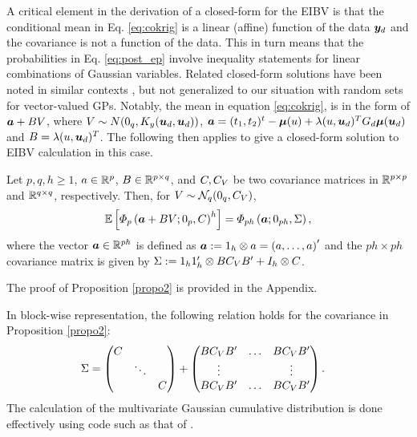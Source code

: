 \documentclass[aoas]{imsart}
\begin{document}
A critical element in the derivation of a closed-form for the EIBV is
that the conditional mean in Eq. \eqref{eq:cokrig} is a linear
(affine) function of the data ${\boldsymbol y}_d$ and the covariance is not a
function of the data. This in turn means that the probabilities in Eq.
\eqref{eq:post_ep} involve inequality statements for linear
combinations of Gaussian variables. Related closed-form solutions have
been noted in similar contexts \citep{bhattacharjya2013value,
  chevalier2014fast,stroh}, but not generalized to our situation with
random sets for vector-valued GPs. Notably, the mean in equation
\eqref{eq:cokrig}, is in the form of ${\boldsymbol a}+B V$, where
$V \sim N(0_q, K_y ({\boldsymbol u}_d,{\boldsymbol u}_d))$,
${\boldsymbol a}=(t_1,t_2)^t-{\boldsymbol \mu}(u)+\lambda(u,{\boldsymbol u}_d)^T G_d {\boldsymbol \mu}({\boldsymbol u}_d)$
and $B=\lambda(u,{\boldsymbol u}_d)^T$. The following then applies to give a
closed-form solution to EIBV calculation in this case.

\begin{propo}
	\label{propo2}
	Let $p, q, h \geq 1$, $a \in \mathbb{R}^p$, $B \in \mathbb{R}^{p\times q}$,
	and $C, C_{V}$ be two covariance matrices in
	$\mathbb{R}^{p\times p}$ and $\mathbb{R}^{q\times q}$, respectively.
	Then, for $V \sim \mathcal{N}_{q}(0_q, C_{V})$,
	\begin{equation*}
	\mathbb{E}\left[ \varPhi_{p}\left( \ba + BV; 0_p,\covN \right)^h \right]
	=
	\varPhi_{ph}
	\left(
	\ba
	;0_{ph},
	\Sigma
	\right),
	\end{equation*}
	where the vector ${\boldsymbol a} \in \mathbb{R}^{p h}$ is defined as 
	${\boldsymbol a} := 1_h\otimes a = 
	\left(a, \dots , a
	\right)'$
	and the $p h\times p h$ covariance matrix is given by
	$\Sigma := 
	1_h 1_h'\otimes BC_{V} B' + I_h\otimes C$.
\end{propo}
The proof of Proposition \ref{propo2} is provided in the Appendix. 

In block-wise representation, the following relation holds for the
covariance in Proposition \ref{propo2}: 
\begin{align*}
	\Sigma&=
	\begin{pmatrix}
	\covN & &\\
	& \ddots &\\
	&   & \covN
	\end{pmatrix}
	+
	\begin{pmatrix}
	B\covV B' & \dots & B\covV  B'\\
	\vdots & & \vdots\\
	B\covV B' & \dots & B\covV B'\\
	\end{pmatrix}.
\end{align*}
The calculation of the multivariate Gaussian cumulative distribution
is done effectively using code such as that of
\cite{genz2009computation}. 
\end{document}
